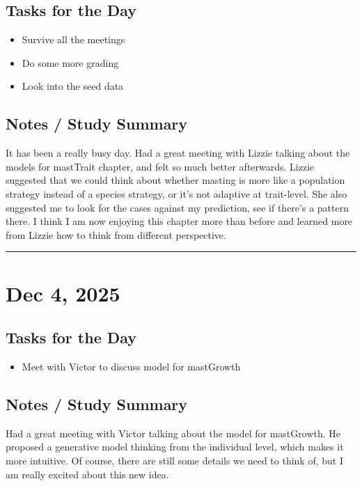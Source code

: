 \documentclass[12pt]{article}
\begin{document}
\subsection*{Tasks for the Day}
\begin{itemize}
    \item Survive all the meetings
    \item Do some more grading
    \item Look into the seed data
\end{itemize}
\subsection*{Notes / Study Summary}
It has been a really busy day. Had a great meeting with Lizzie talking about the models for mastTrait chapter, and felt so much better afterwards. Lizzie suggested that we could think about whether masting is more like a population strategy instead of a species strategy, or it's not adaptive at trait-level. She also suggested me to look for the cases against my prediction, see if there's a pattern there. I think I am now enjoying this chapter more than before and learned more from Lizzie how to think from different perspective.

\vspace{1em}
\hrule
\vspace{1em}

\section*{Dec 4, 2025}

\subsection*{Tasks for the Day}
\begin{itemize}
    \item Meet with Victor to discuss model for mastGrowth
\end{itemize}
\subsection*{Notes / Study Summary}
Had a great meeting with Victor talking about the model for mastGrowth. He proposed a generative model thinking from the individual level, which makes it more intuitive. Of course, there are still some details we need to think of, but I am really excited about this new idea.
\end{document}
